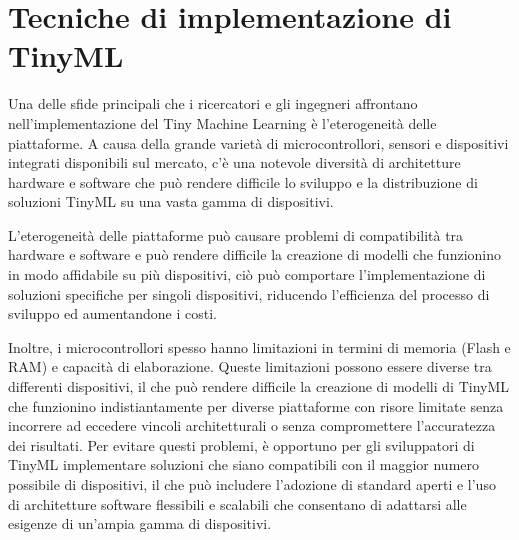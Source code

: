 \section{Tecniche di implementazione di TinyML}

Una delle sfide principali che i ricercatori e gli ingegneri affrontano nell'implementazione del Tiny Machine Learning è l'eterogeneità delle piattaforme. A causa della grande varietà di microcontrollori, sensori e dispositivi integrati disponibili sul mercato, c'è una notevole diversità di architetture hardware e software che può rendere difficile lo sviluppo e la distribuzione di soluzioni TinyML su una vasta gamma di dispositivi. 

L'eterogeneità delle piattaforme può causare problemi di compatibilità tra hardware e software e può rendere difficile la creazione di modelli che funzionino in modo affidabile su più dispositivi, ciò può comportare l'implementazione di soluzioni specifiche per singoli dispositivi, riducendo l'efficienza del processo di sviluppo ed aumentandone i costi.

Inoltre, i microcontrollori spesso hanno limitazioni in termini di memoria (Flash e RAM) e capacità di elaborazione. Queste limitazioni possono essere diverse tra differenti dispositivi, il che può rendere difficile la creazione di modelli di TinyML che funzionino indistiantamente per diverse piattaforme con risore limitate senza incorrere ad eccedere vincoli architetturali o senza compromettere l'accuratezza dei risultati.
Per evitare questi problemi, è opportuno per gli sviluppatori di TinyML implementare soluzioni che siano compatibili con il maggior numero possibile di dispositivi, il che può includere l'adozione di standard aperti e l'uso di architetture software flessibili e scalabili che consentano di adattarsi alle esigenze di un'ampia gamma di dispositivi.

